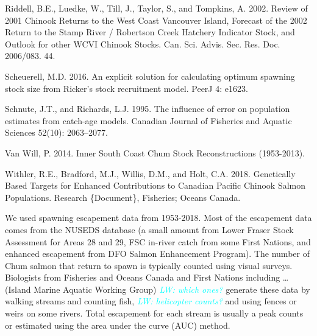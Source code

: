 \documentclass[11pt]{book}
\begin{document}
\begin{CSLReferences}{1}{0}
%
Riddell, B.E., Luedke, W., Till, J., Taylor, S., and Tompkins, A. 2002. Review of 2001 {Chinook} {Returns} to the {West} {Coast} {Vancouver} {Island}, {Forecast} of the 2002 {Return} to the {Stamp} {River} / {Robertson} {Creek} {Hatchery} {Indicator} {Stock}, and {Outlook} for other {WCVI} {Chinook} {Stocks}. Can. Sci. Advis. Sec. Res. Doc. 2006/083. 44.

%
Scheuerell, M.D. 2016. An explicit solution for calculating optimum spawning stock size from {Ricker}'s stock recruitment model. PeerJ 4: e1623.

%
Schnute, J.T., and Richards, L.J. 1995. The influence of error on population estimates from catch-age models. Canadian Journal of Fisheries and Aquatic Sciences 52(10): 2063--2077.

%
Van Will, P. 2014. Inner {South} {Coast} {Chum} {Stock} {Reconstructions} (1953-2013).

%
Withler, R.E., Bradford, M.J., Willis, D.M., and Holt, C.A. 2018. Genetically {Based} {Targets} for {Enhanced} {Contributions} to {Canadian} {Pacific} {Chinook} {Salmon} {Populations}. Research \{Document\}, Fisheries; Oceans Canada.

\end{CSLReferences}
\setlength{\parindent}{0in} \setlength{\leftskip}{0in} \setlength{\parskip}{4pt}

\Appendices


\clearpage

\label{app:08-appendix-chum-data}

\hypertarget{spawner-counts-escapement}{%
\label{spawner-counts-escapement}}

We used spawning escapement data from 1953-2018. Most of the escapement data comes from the NUSEDS database (a small amount from Lower Fraser Stock Assessment for Areas 28 and 29, FSC in-river catch from some First Nations, and enhanced escapement from DFO Salmon Enhancement Program). The number of Chum salmon that return to spawn is typically counted using visual surveys. Biologists from Fisheries and Oceans Canada and First Nations including \ldots{} (Island Marine Aquatic Working Group) \emph{\textcolor{cyan}{LW: which ones?}} generate these data by walking streams and counting fish, \emph{\textcolor{cyan}{LW: helicopter counts?}} and using fences or weirs on some rivers. Total escapement for each stream is usually a peak counts or estimated using the area under the curve (AUC) method.
\end{document}
